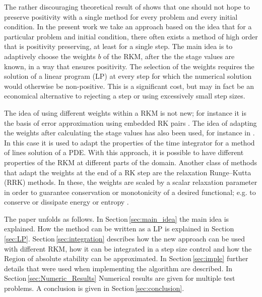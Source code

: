 \documentclass[a4paper]{article}
\numberwithin{equation}{section}
\theoremstyle{plain}
\theoremstyle{definition}
\numberwithin{theorem}{section}
\newcommand{\1}{\mathbbm{1}}
\begin{document}
The rather discouraging theoretical result of \cite{bolley_conservation_1978} shows that one
should not hope to preserve positivity with a single method for every problem and every
initial condition.  In the present work we take an approach based on the idea that for
a particular problem and initial condition, there often exists a method of high order
that is positivity preserving, at least for a single step.
The main idea is to adaptively choose the weights $b$ of the RKM, after the
the stage values are known, in a way that ensures positivity.  
The selection of the weights requires the solution of a linear program (LP) at every
step for which the numerical solution would otherwise be non-positive.
This is a significant cost, but may in fact be an economical alternative to rejecting
a step or using excessively small step sizes.

The idea of using different weights within a RKM is not new; for instance it is
the basis of error approximation using embedded RK pairs \cite{hairer_solving_1993}.
The idea of adapting the weights after calculating the stage values has also been used,
for instance in \cite{ketcheson_spatially_2013}.
In this case it is used to adapt the properties of the time integrator for a method of lines solution of a PDE. With this approach, it is possible to have different properties of the RKM at different parts of the domain. 
Another class of methods that adapt the weights at the end of a RK step
are the relaxation Runge–Kutta (RRK) methods. 
In these, the weights are scaled by a scalar relaxation parameter in order to guarantee
conservation or monotonicity of a desired functional; e.g. to conserve or
dissipate energy or entropy
\cite{ketcheson_relaxation_2019,ranocha_relaxation_2019}.


The paper unfolds as follows. In Section\,\ref{sec:main_idea} the main idea is explained. How the method can be written as a LP is explained in Section\,\ref{sec:LP}.
Section\,\ref{sec:integration} describes how the new approach can be used with different RKM, how it can be integrated in a step size control and how the Region of absolute stability can be approximated.  
In Section\,\ref{sec:imple} further details that were used when implementing the algorithm are described.
In Section\,\ref{sec:Numeric_Results} Numerical results are given for multiple test problems.
A conclusion is given in Section\,\ref{sec:conclusion}.

\end{document}
